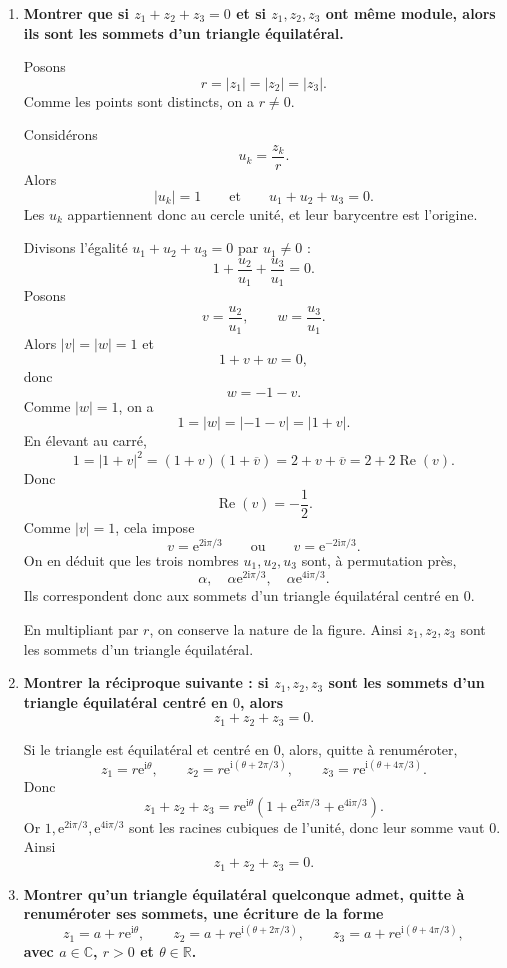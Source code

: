 \documentclass[11pt,a4paper]{article}
\newcommand{\C}{\mathbb{C}}
\newcommand{\R}{\mathbb{R}}
\newcommand{\ii}{\mathrm{i}}
\newcommand{\e}{\mathrm{e}}
\newcommand{\conj}[1]{\overline{#1}}
\newcommand{\re}{\operatorname{Re}}
\begin{document}
\begin{enumerate}[label=\textbf{D1.\arabic*.}]
    \item \textbf{Montrer que si \(z_1+z_2+z_3=0\) et si \(z_1,z_2,z_3\) ont même module, alors ils sont les sommets d’un triangle équilatéral.}

    Posons
    \[
    r=|z_1|=|z_2|=|z_3|.
    \]
    Comme les points sont distincts, on a \(r\neq 0\).

    Considérons
    \[
    u_k=\frac{z_k}{r}.
    \]
    Alors
    \[
    |u_k|=1
    \qquad\text{et}\qquad
    u_1+u_2+u_3=0.
    \]
    Les \(u_k\) appartiennent donc au cercle unité, et leur barycentre est l’origine.

    Divisons l’égalité \(u_1+u_2+u_3=0\) par \(u_1\neq 0\) :
    \[
    1+\frac{u_2}{u_1}+\frac{u_3}{u_1}=0.
    \]
    Posons
    \[
    v=\frac{u_2}{u_1},
    \qquad
    w=\frac{u_3}{u_1}.
    \]
    Alors \(|v|=|w|=1\) et
    \[
    1+v+w=0,
    \]
    donc
    \[
    w=-1-v.
    \]
    Comme \(|w|=1\), on a
    \[
    1=|w|=|-1-v|=|1+v|.
    \]
    En élevant au carré,
    \[
    1=|1+v|^2=(1+v)(1+\conj v)=2+v+\conj v=2+2\re(v).
    \]
    Donc
    \[
    \re(v)=-\frac12.
    \]
    Comme \(|v|=1\), cela impose
    \[
    v=\e^{2\ii\pi/3}
    \qquad\text{ou}\qquad
    v=\e^{-2\ii\pi/3}.
    \]
    On en déduit que les trois nombres \(u_1,u_2,u_3\) sont, à permutation près,
    \[
    \alpha,\quad \alpha\e^{2\ii\pi/3},\quad \alpha\e^{4\ii\pi/3}.
    \]
    Ils correspondent donc aux sommets d’un triangle équilatéral centré en \(0\).

    En multipliant par \(r\), on conserve la nature de la figure. Ainsi \(z_1,z_2,z_3\) sont les sommets d’un triangle équilatéral.

    \item \textbf{Montrer la réciproque suivante : si \(z_1,z_2,z_3\) sont les sommets d’un triangle équilatéral centré en \(0\), alors
    \[
    z_1+z_2+z_3=0.
    \]}

    Si le triangle est équilatéral et centré en \(0\), alors, quitte à renuméroter,
    \[
    z_1=r\e^{\ii\theta},\qquad
    z_2=r\e^{\ii(\theta+2\pi/3)},\qquad
    z_3=r\e^{\ii(\theta+4\pi/3)}.
    \]
    Donc
    \[
    z_1+z_2+z_3
    =r\e^{\ii\theta}\left(1+\e^{2\ii\pi/3}+\e^{4\ii\pi/3}\right).
    \]
    Or \(1,\e^{2\ii\pi/3},\e^{4\ii\pi/3}\) sont les racines cubiques de l’unité, donc leur somme vaut \(0\). Ainsi
    \[
    \boxed{z_1+z_2+z_3=0.}
    \]

    \item \textbf{Montrer qu’un triangle équilatéral quelconque admet, quitte à renuméroter ses sommets, une écriture de la forme
    \[
    z_1=a+r\e^{\ii\theta},\qquad
    z_2=a+r\e^{\ii(\theta+2\pi/3)},\qquad
    z_3=a+r\e^{\ii(\theta+4\pi/3)},
    \]
    avec \(a\in\C\), \(r>0\) et \(\theta\in\R\).}


\end{enumerate}
\end{document}
